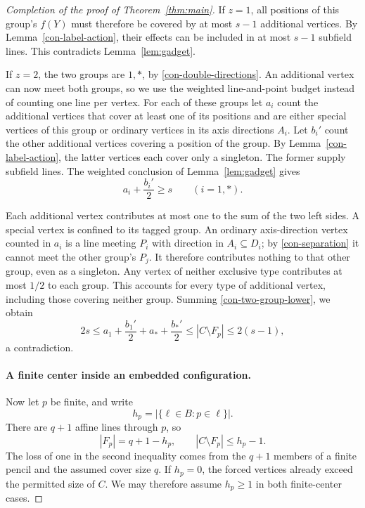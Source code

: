 \begin{proof}[Completion of the proof of Theorem~\ref{thm:main}]
If \(z=1\), all positions of this group's \(f(Y)\) must therefore
be covered by at most \(s-1\) additional vertices.  By
Lemma~\ref{con-label-action}, their effects can be included in at
most \(s-1\) subfield lines.  This contradicts
Lemma~\ref{lem:gadget}.

If \(z=2\), the two groups are \(1,*\), by
\eqref{con-double-directions}.  An additional vertex can now meet
both groups, so we use the weighted line-and-point budget instead of
counting one line per vertex.  For each of these groups let \(a_i\)
count the additional vertices that cover at least one of its
positions and are either special vertices of this group or ordinary
vertices in its axis directions \(A_i\).  Let \(b_i'\) count the
other additional vertices covering a position of the group.  By
Lemma~\ref{con-label-action}, the latter vertices each cover only
a singleton.  The former supply subfield lines.  The weighted
conclusion of Lemma~\ref{lem:gadget} gives
\begin{equation}
\label{con-two-group-lower}
 a_i+\frac{b_i'}2\ge s
 \qquad (i=1,*).
\end{equation}

Each additional vertex contributes at most one to the sum of the
two left sides.  A special vertex is confined to its tagged group.
An ordinary axis-direction vertex counted in \(a_i\) is a line
meeting \(P_i\) with direction in \(A_i\subseteq D_i\); by
\eqref{con-separation} it cannot meet the other group's \(P_j\).
It therefore contributes nothing to that other group, even as a
singleton.  Any vertex of neither exclusive type contributes at
most \(1/2\) to each group.  This accounts for every type of
additional vertex, including those covering neither group.
Summing \eqref{con-two-group-lower}, we obtain
\[
 2s\le a_1+\frac{b_1'}2+a_*+\frac{b_*'}2
 \le |C\setminus F_p|\le2(s-1),
\]
a contradiction.

\paragraph{A finite center inside an embedded configuration.}
Now let \(p\) be finite, and write
\[
 h_p=|\{\ell\in B:p\in\ell\}|.
\]
There are \(q+1\) affine lines through \(p\), so
\begin{equation}
\label{con-finite-budget}
 |F_p|=q+1-h_p,
 \qquad |C\setminus F_p|\le h_p-1.
\end{equation}
The loss of one in the second inequality comes from the \(q+1\)
members of a finite pencil and the assumed cover size \(q\).
If \(h_p=0\), the forced vertices already exceed the permitted
size of \(C\).  We may therefore assume \(h_p\ge1\) in both
finite-center cases.


\end{proof}
